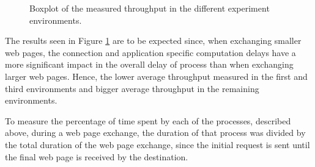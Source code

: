 \begin{figure}[ht]
	\noindent{}
	\caption{\label{fig:boxplotthroughput} Boxplot of the measured throughput in the different experiment environments.}
\end{figure}

The results seen in Figure \ref{fig:boxplotthroughput} are to be expected since, when exchanging smaller web pages, the connection and application specific computation delays have a more significant impact in the overall delay of process than when exchanging larger web pages. Hence, the lower average throughput measured in the first and third environments and bigger average throughput in the remaining environments.

To measure the percentage of time spent by each of the processes, described above, during a web page exchange, the duration of that process was divided by the total duration of the web page exchange, since the initial request is sent until the final web page is received by the destination.

